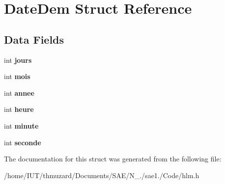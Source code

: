 \hypertarget{struct_date_dem}{}\section{Date\+Dem Struct Reference}
\label{struct_date_dem}
\subsection*{Data Fields}
\begin{DoxyCompactItemize}
\item 
\mbox{\label{struct_date_dem_a14cfca53638083a91dc9d133a57126d1}} 
int {\bfseries jours}
\item 
\mbox{\label{struct_date_dem_af4d47133f30c1a134b6cecf5cedd7db9}} 
int {\bfseries mois}
\item 
\mbox{\label{struct_date_dem_acfe2ff64f5396827db36f1575c5e99d8}} 
int {\bfseries annee}
\item 
\mbox{\label{struct_date_dem_af109a7090a39da6ff71d5c31dbde1e09}} 
int {\bfseries heure}
\item 
\mbox{\label{struct_date_dem_a5edffad982a0566ad01d95005474eae3}} 
int {\bfseries minute}
\item 
\mbox{\label{struct_date_dem_acc9b185ad0fb0cdebb456ba26fa2828d}} 
int {\bfseries seconde}
\end{DoxyCompactItemize}


The documentation for this struct was generated from the following file\+:\begin{DoxyCompactItemize}
\item 
/home/\+I\+U\+T/thmuzard/\+Documents/\+S\+A\+E/\+N\+\_./sae1./\+Code/hlm.\+h\end{DoxyCompactItemize}
